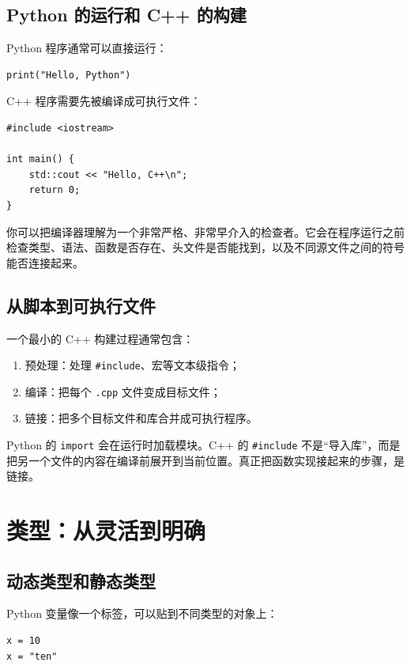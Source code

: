 \documentclass[UTF8,openany]{ctexbook}
\begin{document}
\section{Python 的运行和 C++ 的构建}

Python 程序通常可以直接运行：

\begin{lstlisting}[style=pythonstyle]
print("Hello, Python")
\end{lstlisting}

C++ 程序需要先被编译成可执行文件：

\begin{lstlisting}[style=cppstyle]
#include <iostream>

int main() {
    std::cout << "Hello, C++\n";
    return 0;
}
\end{lstlisting}

你可以把编译器理解为一个非常严格、非常早介入的检查者。它会在程序运行之前检查类型、语法、函数是否存在、头文件是否能找到，以及不同源文件之间的符号能否连接起来。

\section{从脚本到可执行文件}

一个最小的 C++ 构建过程通常包含：

\begin{enumerate}[noitemsep]
  \item 预处理：处理 \texttt{\#include}、宏等文本级指令；
  \item 编译：把每个 \texttt{.cpp} 文件变成目标文件；
  \item 链接：把多个目标文件和库合并成可执行程序。
\end{enumerate}

Python 的 \texttt{import} 会在运行时加载模块。C++ 的 \texttt{\#include} 不是“导入库”，而是把另一个文件的内容在编译前展开到当前位置。真正把函数实现接起来的步骤，是链接。

\chapter{类型：从灵活到明确}

\section{动态类型和静态类型}

Python 变量像一个标签，可以贴到不同类型的对象上：

\begin{lstlisting}[style=pythonstyle]
x = 10
x = "ten"
\end{lstlisting}
\end{document}
